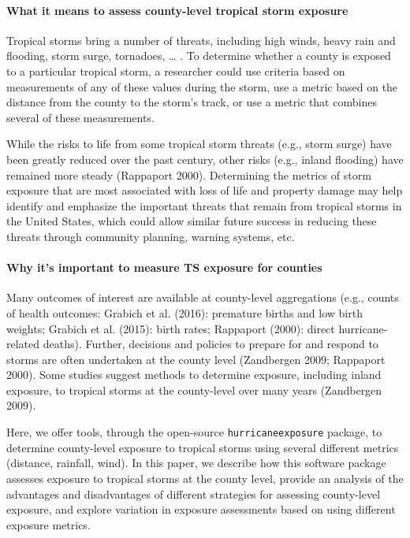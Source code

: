 \documentclass[]{elsarticle} %
\begin{document}
\paragraph{What it means to assess county-level tropical storm
exposure}\label{what-it-means-to-assess-county-level-tropical-storm-exposure}

Tropical storms bring a number of threats, including high winds, heavy
rain and flooding, storm surge, tornadoes, \ldots{} . To determine
whether a county is exposed to a particular tropical storm, a researcher
could use criteria based on measurements of any of these values during
the storm, use a metric based on the distance from the county to the
storm's track, or use a metric that combines several of these
measurements.

While the risks to life from some tropical storm threats (e.g., storm
surge) have been greatly reduced over the past century, other risks
(e.g., inland flooding) have remained more steady (Rappaport 2000).
Determining the metrics of storm exposure that are most associated with
loss of life and property damage may help identify and emphasize the
important threats that remain from tropical storms in the United States,
which could allow similar future success in reducing these threats
through community planning, warning systems, etc.

\paragraph{Why it's important to measure TS exposure for
counties}\label{why-its-important-to-measure-ts-exposure-for-counties}

Many outcomes of interest are available at county-level aggregations
(e.g., counts of health outcomes: Grabich et al. (2016): premature
births and low birth weights; Grabich et al. (2015): birth rates;
Rappaport (2000): direct hurricane-related deaths). Further, decisions
and policies to prepare for and respond to storms are often undertaken
at the county level (Zandbergen 2009; Rappaport 2000). Some studies
suggest methods to determine exposure, including inland exposure, to
tropical storms at the county-level over many years (Zandbergen 2009).

Here, we offer tools, through the open-source \texttt{hurricaneexposure}
package, to determine county-level exposure to tropical storms using
several different metrics (distance, rainfall, wind). In this paper, we
describe how this software package assesses exposure to tropical storms
at the county level, provide an analysis of the advantages and
disadvantages of different strategies for assessing county-level
exposure, and explore variation in exposure assessments based on using
different exposure metrics.
\end{document}
